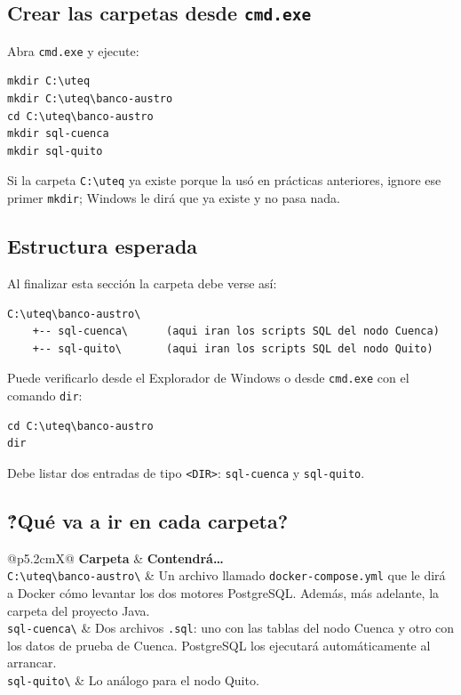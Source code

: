 \documentclass[11pt,a4paper]{article}
\begin{document}
\subsection{Crear las carpetas desde \texttt{cmd.exe}}

Abra \texttt{cmd.exe} y ejecute:

\begin{lstlisting}[style=bashstyle,caption={Crear la ra\'iz y las dos subcarpetas de scripts SQL}]
mkdir C:\uteq
mkdir C:\uteq\banco-austro
cd C:\uteq\banco-austro
mkdir sql-cuenca
mkdir sql-quito
\end{lstlisting}

Si la carpeta \texttt{C:\textbackslash uteq} ya existe porque la us\'o en pr\'acticas anteriores, ignore ese primer \texttt{mkdir}; Windows le dir\'a que ya existe y no pasa nada.

\subsection{Estructura esperada}

Al finalizar esta secci\'on la carpeta debe verse as\'i:

\begin{lstlisting}[style=plainstyle,caption={Estructura inicial del proyecto}]
C:\uteq\banco-austro\
    +-- sql-cuenca\      (aqui iran los scripts SQL del nodo Cuenca)
    +-- sql-quito\       (aqui iran los scripts SQL del nodo Quito)
\end{lstlisting}

Puede verificarlo desde el Explorador de Windows o desde \texttt{cmd.exe} con el comando \texttt{dir}:

\begin{lstlisting}[style=bashstyle]
cd C:\uteq\banco-austro
dir
\end{lstlisting}

Debe listar dos entradas de tipo \texttt{<DIR>}: \texttt{sql-cuenca} y \texttt{sql-quito}.

\subsection{\'?Qu\'e va a ir en cada carpeta?}

\begin{xltabular}{\textwidth}{@{}p{5.2cm}X@{}}
\toprule
\textbf{Carpeta} & \textbf{Contendr\'a\ldots} \\
\midrule
\texttt{C:\textbackslash uteq\textbackslash banco-austro\textbackslash} & Un archivo llamado \texttt{docker-compose.yml} que le dir\'a a Docker c\'omo levantar los dos motores PostgreSQL. Adem\'as, m\'as adelante, la carpeta del proyecto Java. \\
\texttt{sql-cuenca\textbackslash} & Dos archivos \texttt{.sql}: uno con las tablas del nodo Cuenca y otro con los datos de prueba de Cuenca. PostgreSQL los ejecutar\'a autom\'aticamente al arrancar. \\
\texttt{sql-quito\textbackslash} & Lo an\'alogo para el nodo Quito. \\
\bottomrule
\end{xltabular}
\end{document}
